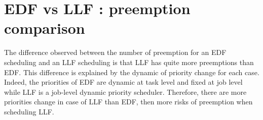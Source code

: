 \documentclass{article}
\begin{document}
\section{EDF vs LLF : preemption comparison}

The difference observed between the number of preemption for an EDF scheduling and an LLF scheduling is that LLF has quite more preemptions than EDF. This difference is explained by the dynamic of priority change for each case. Indeed, the priorities of EDF are dynamic at task level and fixed at job level while LLF is a job-level dynamic priority scheduler. Therefore, there are more priorities change in case of LLF than EDF, then more risks of preemption when scheduling LLF.
\end{document}
